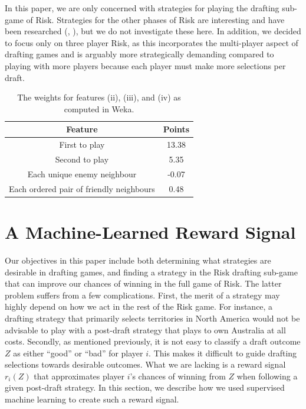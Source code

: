 \documentclass[letterpaper]{article}
\numberwithin{equation}{section}
\numberwithin{theorem}{section}
\numberwithin{lemma}{section}
\numberwithin{df}{section}
\begin{document}
In this paper, we are only concerned with strategies for playing the drafting sub-game of Risk.  Strategies for the other phases of Risk are interesting and have been researched (\cite{RiskBots}, \cite{ZuckFelnerKraus2009}), but we do not investigate these here.  In addition, we decided to focus only on three player Risk, as this incorporates the multi-player aspect of drafting games and is arguably more strategically demanding compared to playing with more players because each player must make more selections per draft.

\begin{table}[t]
	\centering
		\caption{The weights for features (ii), (iii), and (iv) as computed in Weka.} 
		\label{tab:MoreScoring}
		\begin{footnotesize}
		\begin{tabular}{|c|c|}
			\hline
			\textbf{Feature} & \textbf{Points} \\
			\hline
			First to play & 13.38 \\
			\hline
			Second to play & 5.35 \\
			\hline
			Each unique enemy neighbour & -0.07 \\
			\hline
			Each ordered pair of friendly neighbours & 0.48 \\
			\hline
		\end{tabular}
		\end{footnotesize}
	
\end{table}

\section{A Machine-Learned Reward Signal}

Our objectives in this paper include both determining what strategies are desirable in drafting games, and finding a strategy in the Risk drafting sub-game that can improve our chances of winning in the full game of Risk.  The latter problem suffers from a few complications.  First, the merit of a strategy may highly depend on how we act in the rest of the Risk game.  For instance, a drafting strategy that primarily selects territories in North America would not be advisable to play with a post-draft strategy that plays to own Australia at all costs.  %
Secondly, as mentioned previously, it is not easy to classify a draft outcome $Z$ as either ``good'' or ``bad'' for player $i$.  This makes it difficult to guide drafting selections towards desirable outcomes.  What we are lacking is a reward signal $r_i(Z)$ that approximates player $i$'s chances of winning from $Z$ when following a given post-draft strategy.  In this section, we describe how we used supervised machine learning to create such a reward signal.
\end{document}
